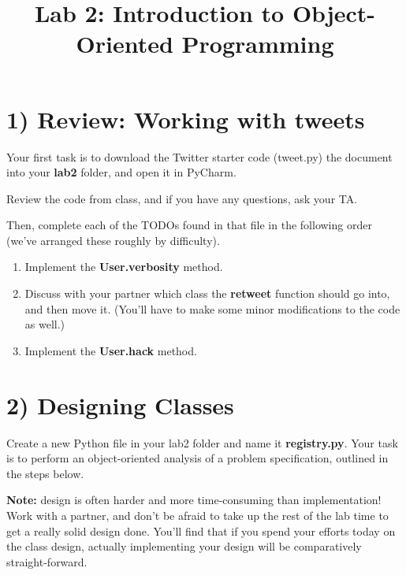 \documentclass[12pt]{article}
\begin{document}
\title{Lab 2: Introduction to Object-Oriented Programming}
\date{}
\maketitle

\section*{1) Review: Working with tweets}
Your first task is to download the Twitter starter code (tweet.py) the document
into your \textbf{lab2} folder, and open it in PyCharm.

\bigskip

\noindent Review the code from class, and if you have any questions, ask your TA.

\bigskip

\noindent Then, complete each of the TODOs found in that file in the following
order (we’ve arranged these roughly by difficulty).

\bigskip

\begin{enumerate}[1.]
    \item Implement the \textbf{User.verbosity} method.
    \item Discuss with your partner which class the \textbf{retweet} function
    should go into,
    and then move it. (You’ll have to make some minor modifications to the code
    as well.)
    \item Implement the \textbf{User.hack} method.
\end{enumerate}

\bigskip

\section*{2) Designing Classes}

Create a new Python file in your lab2 folder and name it \textbf{registry.py}.
Your task is to perform an object-oriented analysis of a problem specification,
outlined in the steps below.

\bigskip

\textbf{Note:} design is often harder and more time-consuming than implementation!
Work with a partner, and don’t be afraid to take up the rest of the lab time to
get a really solid design done. You’ll find that if you spend your efforts today
on the class design, actually implementing your design will be comparatively
straight-forward.
\end{document}
